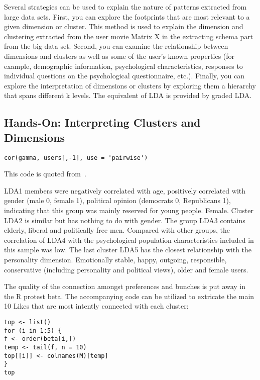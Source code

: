 Several strategies can be used to explain the nature of patterns 
extracted from large data sets. First, you can explore the 
footprints that are most relevant to a given dimension or cluster.
 This method is used to explain the dimension and clustering 
extracted from the user movie Matrix X in the extracting schema 
part from the big data set. Second, you can examine the 
relationship between dimensions and clusters as well as some of 
the user's known properties (for example, demographic information,
 psychological characteristics, responses to individual questions 
on the psychological questionnaire, etc.). Finally, you can 
explore the interpretation of dimensions or clusters by exploring 
them a hierarchy that spans different k levels. The equivalent of 
LDA is provided by graded LDA.

\subsection{Hands-On: Interpreting Clusters and Dimensions}

\begin{verbatim}
cor(gamma, users[,-1], use = 'pairwise')
\end{verbatim}

This code is quoted from~\cite{editor12}.

LDA1 members were negatively correlated with age, positively 
correlated with gender (male 0, female 1), political opinion 
(democrats 0, Republicans 1), indicating that this group was mainly
 reserved for young people. Female. Cluster LDA2 is similar but has
 nothing to do with gender. The group LDA3 contains elderly, 
liberal and politically free men. Compared with other groups, the 
correlation of LDA4 with the psychological population 
characteristics included in this sample was low. The last cluster 
LDA5 has the closest relationship with the personality dimension. 
Emotionally stable, happy, outgoing, responsible, conservative 
(including personality and political views), older and female users.

The quality of the connection amongst preferences and bunches is 
put away in the R protest beta. The accompanying code can be 
utilized to extricate the main 10 Likes that are most intently 
connected with each cluster:

\begin{verbatim}
top <- list()
for (i in 1:5) {
f <- order(beta[i,])
temp <- tail(f, n = 10)
top[[i]] <- colnames(M)[temp]
}
top
\end{verbatim}

